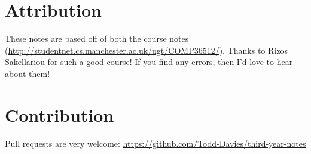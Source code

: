 \section*{Attribution}

These notes are based off of both the course notes
(\url{http://studentnet.cs.manchester.ac.uk/ugt/COMP36512/}). Thanks
to Rizos Sakellariou for such a good course! If you find any errors,
then I'd love to hear about them!

\section*{Contribution}

Pull requests are very welcome:
\url{https://github.com/Todd-Davies/third-year-notes}
